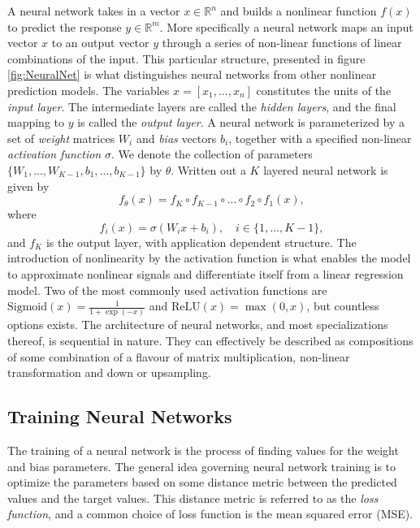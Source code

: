 \documentclass[../../thesis.tex]{subfiles}
\begin{document}
A neural network takes in a vector $x \in \mathbb{R}^n$ and builds a nonlinear function $f(x)$ to predict the response $y\in \mathbb{R}^m$. More specifically a neural network maps an input vector $x$ to an output vector $y$ through a series of non-linear functions of linear combinations of the input. This particular structure, presented in figure \ref{fig:NeuralNet} is what distinguishes neural networks from other nonlinear prediction models. The variables $x = [x_1,...,x_n]$ constitutes the units of the \textit{input layer}. The intermediate layers are called the \textit{hidden layers}, and the final mapping to $y$ is called the \textit{output layer}. A neural network is parameterized by a set of \textit{weight} matrices $W_i$ and \textit{bias} vectors $b_i$, together with a specified non-linear \textit{activation function} $\sigma$. We denote the collection of parameters $\{W_1,...,W_{K-1}, b_1,...,b_{K-1}\}$ by $\theta$. Written out a $K$ layered neural network is given by 
\[ 
f_\theta(x) = f_K \circ f_{K-1} \circ \ldots \circ f_2 \circ f_1(x),
\]
where 
$$f_i(x) = \sigma(W_ix+b_i), \quad i \in \{1,...,K-1\},$$ 
and $f_K$ is the output layer, with application dependent structure.\newline
The introduction of nonlinearity by the activation function is what enables the model to approximate nonlinear signals and differentiate itself from a linear regression model. Two of the most commonly used activation functions are $\text{Sigmoid}(x) = \tfrac{1}{1+\exp(-x)}$ and $\text{ReLU}(x) = \max(0,x)$, but countless options exists.\newline
The architecture of neural networks, and most specializations thereof, is sequential in nature. They can effectively be described as compositions of some combination of a flavour of matrix multiplication, non-linear transformation and down or upsampling. 

\subsection{Training Neural Networks}

The training of a neural network is the process of finding values for the weight and bias parameters. The general idea governing neural network training is to optimize the parameters based on some distance metric between the predicted values and the target values. This distance metric is referred to as the \textit{loss function}, and a common choice of loss function is the mean squared error (MSE).\newline
\end{document}
